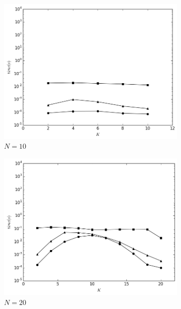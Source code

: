 \begin{figure}[H] 
  \begin{subfigure}[b]{0.5\linewidth}
    \centering
    \includegraphics[width=0.9\linewidth]{Pictures/n10} 
    \caption{$N=10$} 
    \label{fig:fixed_n:a} 
    \vspace{4ex}
  \end{subfigure}%
  \begin{subfigure}[b]{0.5\linewidth}
    \centering
    \includegraphics[width=0.9\linewidth]{Pictures/n20} 
    \caption{$N=20$} 
    \label{fig:fixed_n:b} 
    \vspace{4ex}
  \end{subfigure} 
  \begin{subfigure}[b]{0.5\linewidth}
    \centering

\end{subfigure}
\end{figure}
